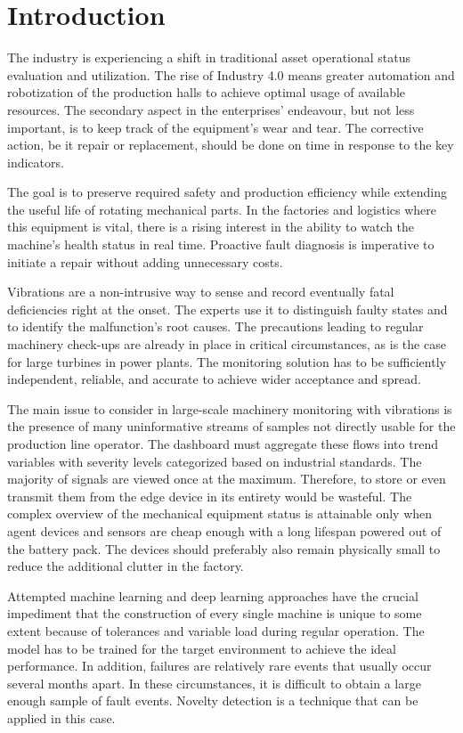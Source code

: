 \chapter{Introduction}
The industry is experiencing a shift in traditional asset operational status evaluation and utilization. The rise of Industry 4.0 means greater automation and robotization of the production halls to achieve optimal usage of available resources. The secondary aspect in the enterprises' endeavour, but not less important, is to keep track of the equipment's wear and tear. The corrective action, be it repair or replacement, should be done on time in response to the key indicators.

The goal is to preserve required safety and production efficiency while extending the useful life of rotating mechanical parts. In the factories and logistics where this equipment is vital, there is a rising interest in the ability to watch the machine's health status in real time. Proactive fault diagnosis is imperative to initiate a repair without adding unnecessary costs.

Vibrations are a non-intrusive way to sense and record eventually fatal deficiencies right at the onset. The experts use it to distinguish faulty states and to identify the malfunction's root causes. The precautions leading to regular machinery check-ups are already in place in critical circumstances, as is the case for large turbines in power plants. The monitoring solution has to be sufficiently independent, reliable, and accurate to achieve wider acceptance and spread.

The main issue to consider in large-scale machinery monitoring with vibrations is the presence of many uninformative streams of samples not directly usable for the production line operator. The dashboard must aggregate these flows into trend variables with severity levels categorized based on industrial standards. The majority of signals are viewed once at the maximum. Therefore, to store or even transmit them from the edge device in its entirety would be wasteful. The complex overview of the mechanical equipment status is attainable only when agent devices and sensors are cheap enough with a long lifespan powered out of the battery pack. The devices should preferably also remain physically small to reduce the additional clutter in the factory.

Attempted machine learning and deep learning approaches have the crucial impediment that the construction of every single machine is unique to some extent because of tolerances and variable load during regular operation. The model has to be trained for the target environment to achieve the ideal performance. In addition, failures are relatively rare events that usually occur several months apart. In these circumstances, it is difficult to obtain a large enough sample of fault events. Novelty detection is a technique that can be applied in this case.

